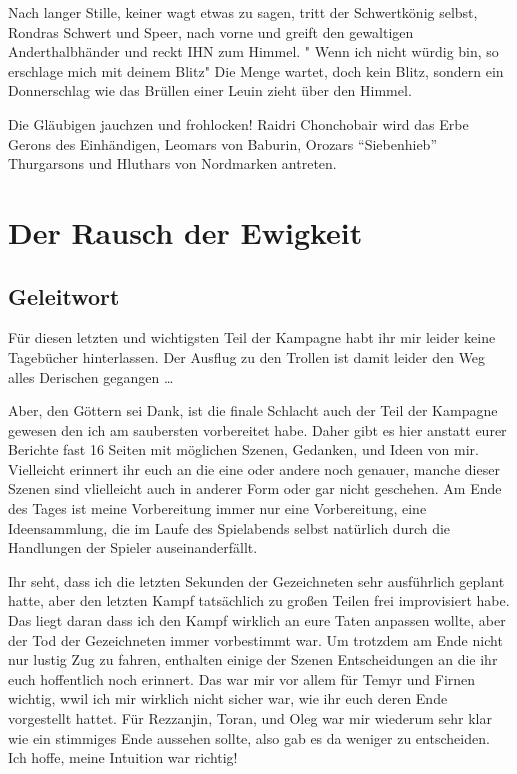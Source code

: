 Nach langer Stille, keiner wagt etwas zu sagen, tritt der Schwertkönig selbst, Rondras Schwert und Speer, nach vorne und greift den gewaltigen Anderthalbhänder und reckt IHN zum Himmel. " Wenn ich nicht würdig bin, so erschlage mich mit deinem Blitz" Die Menge wartet, doch kein Blitz, sondern ein Donnerschlag wie das Brüllen einer Leuin zieht über den Himmel.

Die Gläubigen jauchzen und frohlocken!
Raidri Chonchobair wird das Erbe Gerons des Einhändigen, Leomars von Baburin, Orozars ``Siebenhieb'' Thurgarsons und Hluthars von Nordmarken antreten.

\chapter{Der Rausch der Ewigkeit}

\section{Geleitwort}
Für diesen letzten und wichtigsten Teil der Kampagne habt ihr mir leider keine Tagebücher hinterlassen. Der Ausflug zu den Trollen ist damit leider den Weg alles Derischen gegangen \dots

Aber, den Göttern sei Dank, ist die finale Schlacht auch der Teil der Kampagne gewesen den ich am saubersten vorbereitet habe.
Daher gibt es hier anstatt eurer Berichte fast 16 Seiten mit möglichen Szenen, Gedanken, und Ideen von mir.
Vielleicht erinnert ihr euch an die eine oder andere noch genauer, manche dieser Szenen sind vlielleicht auch in anderer Form oder gar nicht geschehen.
Am Ende des Tages ist meine Vorbereitung immer nur eine Vorbereitung, eine Ideensammlung, die im Laufe des Spielabends selbst natürlich durch die Handlungen der Spieler auseinanderfällt.

Ihr seht, dass ich die letzten Sekunden der Gezeichneten sehr ausführlich geplant hatte, aber den letzten Kampf tatsächlich zu großen Teilen frei improvisiert habe.
Das liegt daran dass ich den Kampf wirklich an eure Taten anpassen wollte, aber der Tod der Gezeichneten immer vorbestimmt war.
Um trotzdem am Ende nicht nur lustig Zug zu fahren, enthalten einige der Szenen Entscheidungen an die ihr euch hoffentlich noch erinnert.
Das war mir vor allem für Temyr und Firnen wichtig, wwil ich mir wirklich nicht sicher war, wie ihr euch deren Ende vorgestellt hattet.
Für Rezzanjin, Toran, und Oleg war mir wiederum sehr klar wie ein stimmiges Ende aussehen sollte, also gab es da weniger zu entscheiden.
Ich hoffe, meine Intuition war richtig!

